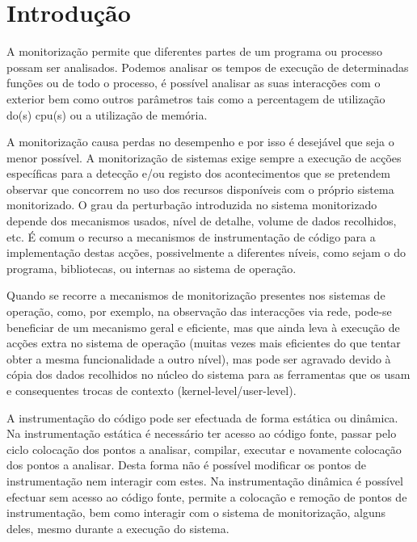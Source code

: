 \documentclass[a4paper]{llncs}
\begin{document}
\section{Introdução}
\label{sec:introduction}

A monitorização permite que diferentes partes de um programa ou processo possam ser analisados. Podemos analisar os tempos de execução de determinadas funções ou de todo o processo, é possível analisar as suas interacções com o exterior bem como outros parâmetros tais como a percentagem de utilização do(s) cpu(s) ou a utilização de memória.





A monitorização causa perdas no desempenho e por isso é desejável que seja o menor possível. 
A monitorização de sistemas exige sempre a execução de acções específicas para a detecção e/ou registo dos acontecimentos que se pretendem observar que concorrem no uso dos recursos disponíveis com o próprio sistema monitorizado. O grau da perturbação introduzida no sistema monitorizado depende dos mecanismos usados, nível de detalhe, volume de dados recolhidos, etc. É comum o recurso a mecanismos de instrumentação de código para a implementação destas acções, possivelmente a diferentes níveis, como sejam o do programa, bibliotecas, ou internas ao sistema de operação.

 Quando se recorre a mecanismos de monitorização presentes nos sistemas de operação, como, por exemplo, na observação das interacções via rede, pode-se beneficiar de um mecanismo geral e eficiente, mas que ainda leva à execução de acções extra no sistema de operação (muitas vezes mais eficientes do que tentar obter a mesma funcionalidade a outro nível), mas pode ser agravado devido à cópia dos dados recolhidos no núcleo do sistema para as ferramentas que os usam e consequentes trocas de contexto (kernel-level/user-level).

A instrumentação do código pode ser efectuada de forma estática ou dinâmica. Na instrumentação estática é necessário ter acesso ao código fonte, passar pelo ciclo colocação dos pontos a analisar, compilar, executar e novamente colocação dos pontos a analisar. Desta forma não é possível modificar os pontos de instrumentação nem interagir com estes. Na instrumentação dinâmica é possível efectuar sem acesso ao código fonte, permite a colocação e remoção de pontos de instrumentação, bem como interagir com o sistema de monitorização, alguns deles, mesmo durante a execução do sistema. 
\end{document}
